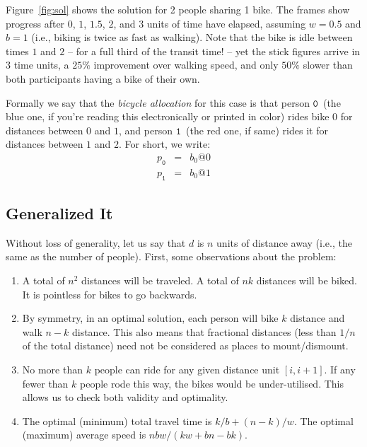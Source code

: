 \documentclass[DIV=calc, paper=a4, fontsize=11pt, twocolumn]{scrartcl}	 %
\newcommand{\initial}[1]{ %
\lettrine[lines=3,lhang=0.3,nindent=0em]{
\color{DarkGoldenrod}
{\textsf{#1}}}{}}
\begin{document}
\initial{F}igure~\ref{fig:sol} shows the solution for 2 people sharing 1 bike.
The frames show progress after $0$, $1$, $1.5$, $2$, and $3$ units of time have elapsed, assuming $w=0.5$ and $b=1$ (i.e., biking is twice as fast as walking).
Note that the bike is idle between times $1$ and $2$ -- for a full third of the transit time! -- yet the stick figures arrive in $3$ time units, a $25\%$ improvement over walking speed, and only $50\%$ slower than both participants having a bike of their own.

\newcommand\PA{\ensuremath{\mathtt{0}}}
\newcommand\PB{\ensuremath{\mathtt{1}}}
\newcommand\PC{\ensuremath{\mathtt{2}}}
\newcommand\PD{\ensuremath{\mathtt{3}}}
\newcommand\PE{\ensuremath{\mathtt{4}}}
\newcommand\PF{\ensuremath{\mathtt{5}}}
\newcommand\PG{\ensuremath{\mathtt{6}}}
\newcommand\distance[1]{\ensuremath{\mathsf{#1}}}
Formally we say that the {\em bicycle allocation} for this case is that person \PA~(the blue one, if you're reading this electronically or printed in color) rides bike $0$ for distances between $0$ and $1$, and person \PB~(the red one, if same) rides it for distances between $1$ and $2$. For short, we write:
\begin{eqnarray*}
	p_\PA &=& b_0@0 \\
	p_\PB &=& b_0@1
\end{eqnarray*}

\subsection{Generalized It}

\initial{W}ithout loss of generality, let us say that $d$ is $n$ units of distance away (i.e., the same as the number of people).
First, some observations about the problem:
\begin{enumerate}
	\setlength{\itemsep}{-0.5em}
	\item A total of $n^2$ distances will be traveled. A total of $nk$ distances will be biked. It is pointless for bikes to go backwards.
	\item By symmetry, in an optimal solution, each person will bike $k$ distance and walk $n-k$ distance. This also means that fractional distances (less than $1/n$ of the total distance) need not be considered as places to mount/dismount.
	\item No more than $k$ people can ride for any given distance unit $[i,i+1]$. If any fewer than $k$ people rode this way, the bikes would be under-utilised. This allows us to check both validity and optimality.
	\item The optimal (minimum) total travel time is $k/b + (n-k)/w$. The optimal (maximum) average speed is $nbw/(kw+bn-bk)$.
\end{enumerate}
\end{document}
